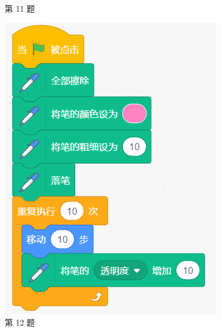 \documentclass[10pt, a4paper]{article}
\begin{document}
\begin{enumerate}
\begin{figure}[htbp]
\begin{minipage}[t]{.26\textwidth}
                \caption*{第 11 题}
            \end{minipage}
            \begin{minipage}[t]{.18\textwidth}
                \centering
                \includegraphics[width=\textwidth]{figure/12.png}
                \caption*{第 12 题}
            \end{minipage}
        \end{figure}


\end{enumerate}
\end{document}
